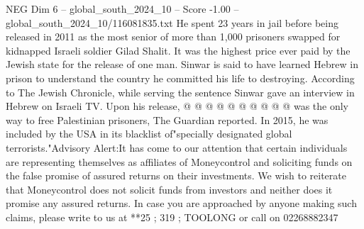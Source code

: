 \begin{textsample}{NEG Dim 6 – global\_south\_2024\_10 – Score -1.00 – global\_south\_2024\_10/116081835.txt}
He spent 23 years in jail before being released in 2011 as the most senior of more than 1,000 prisoners swapped for kidnapped Israeli soldier Gilad Shalit.
It was the highest price ever paid by the Jewish state for the release of one man.
Sinwar is said to have learned Hebrew in prison to understand the country he committed his life to destroying.
According to The Jewish Chronicle, while serving the sentence Sinwar gave an interview in Hebrew on Israeli TV.
Upon his release, @ @ @ @ @ @ @ @ @ @ was the only way to free Palestinian prisoners, The Guardian reported.
In 2015, he was included by the USA in its blacklist of"specially designated global terrorists."Advisory Alert:It has come to our attention that certain individuals are representing themselves as affiliates of Moneycontrol and soliciting funds on the false promise of assured returns on their investments.
We wish to reiterate that Moneycontrol does not solicit funds from investors and neither does it promise any assured returns.
In case you are approached by anyone making such claims, please write to us at **25 ; 319 ; TOOLONG or call on 02268882347

\end{textsample}
